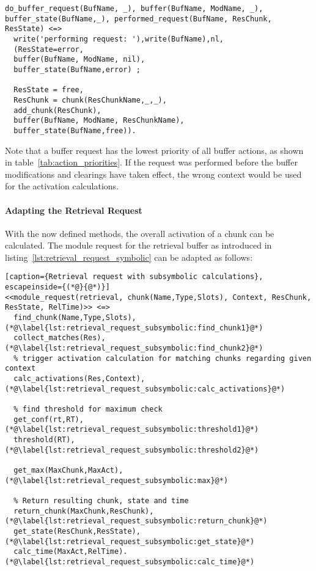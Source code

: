 \begin{lstlisting}[caption=Apply the results of the buffer request]
do_buffer_request(BufName, _), buffer(BufName, ModName, _), buffer_state(BufName,_), performed_request(BufName, ResChunk, ResState) <=>  
  write('performing request: '),write(BufName),nl,
  (ResState=error, 
  buffer(BufName, ModName, nil),
  buffer_state(BufName,error) ;  
  
  ResState = free,
  ResChunk = chunk(ResChunkName,_,_),
  add_chunk(ResChunk), 
  buffer(BufName, ModName, ResChunkName),
  buffer_state(BufName,free)).  
\end{lstlisting}

Note that a buffer request has the lowest priority of all buffer actions, as shown in table~\ref{tab:action_priorities}. If the request was performed before the buffer modifications and clearings have taken effect, the wrong context would be used for the activation calculations.

\paragraph{Adapting the Retrieval Request}

With the now defined methods, the overall activation of a chunk can be calculated. The module request for the retrieval buffer as introduced in listing~\ref{lst:retrieval_request_symbolic} can be adapted as follows:

\begin{lstlisting}[caption={Retrieval request with subsymbolic calculations}, escapeinside={(*@}{@*)}]
<<module_request(retrieval, chunk(Name,Type,Slots), Context, ResChunk, ResState, RelTime)>> <=> 
  find_chunk(Name,Type,Slots), (*@\label{lst:retrieval_request_subsymbolic:find_chunk1}@*)
  collect_matches(Res), (*@\label{lst:retrieval_request_subsymbolic:find_chunk2}@*)
  % trigger activation calculation for matching chunks regarding given context
  calc_activations(Res,Context), (*@\label{lst:retrieval_request_subsymbolic:calc_activations}@*)
  
  % find threshold for maximum check
  get_conf(rt,RT), (*@\label{lst:retrieval_request_subsymbolic:threshold1}@*)
  threshold(RT), (*@\label{lst:retrieval_request_subsymbolic:threshold2}@*)
  
  get_max(MaxChunk,MaxAct), (*@\label{lst:retrieval_request_subsymbolic:max}@*)
  
  % Return resulting chunk, state and time
  return_chunk(MaxChunk,ResChunk), (*@\label{lst:retrieval_request_subsymbolic:return_chunk}@*)
  get_state(ResChunk,ResState), (*@\label{lst:retrieval_request_subsymbolic:get_state}@*)
  calc_time(MaxAct,RelTime). (*@\label{lst:retrieval_request_subsymbolic:calc_time}@*)
\end{lstlisting}

